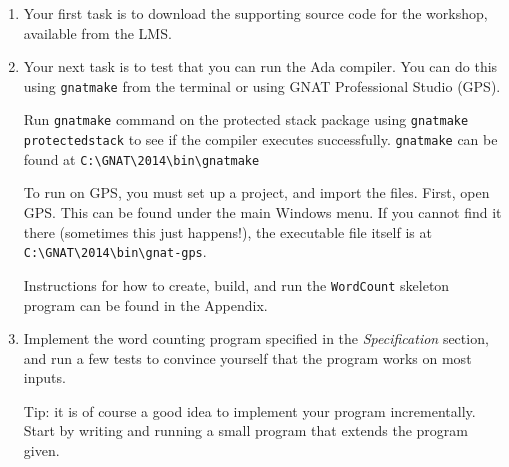 \documentclass{article}
\begin{document}
\begin{enumerate}

 \item Your first task is to download the supporting source code for the workshop, available from the LMS.

\begin{comment}
 get access to the subject repository. All subject material will be hosted on a Git repository. If you are unfamiliar with Git, there is a nice tutorial available at \url{https://confluence.atlassian.com/x/cgozDQ}. For the remainder of this subject, it is assumed that you will now how to pull changes are a git repository.

 The subject repository is hosted at \url{https://gibber_blot@bitbucket.org/gibber_blot/swen90010-2015.git}. 

 To clone this on the command line (Windows, Mac, or Unix), use:

 \quad\texttt{git clone https://gibber\_blot@bitbucket.org/gibber\_blot/swen90010-2015.git}

To update the repository in future, run \texttt{git pull}.
\end{comment}

 \item Your next task is to test that you can run the Ada compiler. You can do this using \texttt{gnatmake} from the terminal or using GNAT Professional Studio (GPS). 

  Run \texttt{gnatmake} command on the protected stack package using \texttt{gnatmake protectedstack} to see if the compiler executes successfully. \texttt{gnatmake} can be found at \texttt{C:\textbackslash GNAT\textbackslash 2014\textbackslash bin\textbackslash gnatmake}

  To run on GPS, you must set up a project, and import the files. First, open GPS. This can be found under the main Windows menu. If you cannot find it there (sometimes this just happens!), the executable file itself is at \texttt{C:\textbackslash GNAT\textbackslash 2014\textbackslash bin\textbackslash gnat-gps}.

 Instructions for how to create, build, and run the \texttt{WordCount} skeleton program can be found in the Appendix.

 \item Implement the word counting program specified in the \emph{Specification} section, and run a few tests to convince yourself that the program works on most inputs.

   Tip: it is of course a good idea to implement your program incrementally. Start by writing and running a small program that extends the program given.


\end{enumerate}
\end{document}
